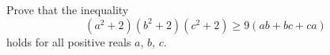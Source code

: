 Prove that the inequality \[\left(a^{2}+2\right)\left(b^{2}+2\right)\left(c^{2}+2\right) \geq 9\left(ab+bc+ca\right)\] holds for all positive reals $a$, $b$, $c$.